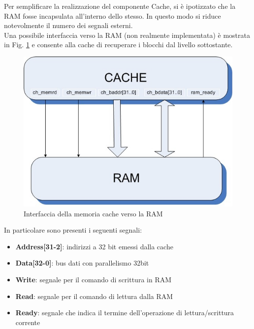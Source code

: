 Per semplificare la realizzazione del componente Cache, si \`e ipotizzato che la RAM fosse incapsulata all'interno dello stesso. In questo modo si riduce notevolmente il numero dei segnali esterni.\\

Una possibile interfaccia verso la RAM (non realmente implementata) \`e mostrata in Fig. \ref{fig:int_ram} e consente alla cache di recuperare i blocchi dal livello sottostante.\\

\begin{figure}[h!]
\centering
\includegraphics[width=\textwidth]{img/cache-ram.jpg}
\caption{Interfaccia della memoria cache verso la RAM}
\label{fig:int_ram}
\end{figure}

In particolare sono presenti i seguenti segnali:
\begin{itemize} %
\item \textbf{Address[31-2]}: indirizzi a 32 bit emessi dalla cache
\item \textbf{Data[32-0]}: bus dati con parallelismo 32bit 
\item \textbf{Write}: segnale per il comando di scrittura in RAM
\item \textbf{Read}: segnale per il comando di lettura dalla RAM
\item \textbf{Ready}: segnale che indica il termine dell'operazione di lettura/scrittura corrente
\end{itemize}




